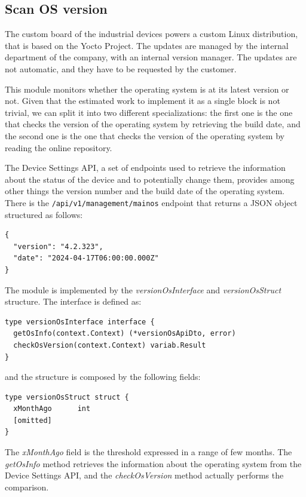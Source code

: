 \subsection{Scan OS version}

The custom board of the industrial devices powers a custom Linux distribution, that is based on the Yocto Project. The updates are managed by the internal department of the company, with an internal version manager. The updates are not automatic, and they have to be requested by the customer.

This module monitors whether the operating system is at its latest version or not. Given that the estimated work to implement it as a single block is not trivial, we can split it into two different specializations: the first one is the one that checks the version of the operating system by retrieving the build date, and the second one is the one that checks the version of the operating system by reading the online repository.

The Device Settings API, a set of endpoints used to retrieve the information about the status of the device and to potentially change them, provides among other things the version number and the build date of the operating system. There is the \texttt{/api/v1/management/mainos} endpoint that returns a JSON object structured as follows:

\begin{lstlisting}
{
  "version": "4.2.323",
  "date": "2024-04-17T06:00:00.000Z"
}
\end{lstlisting}

The module is implemented by the \textit{versionOsInterface} and \textit{versionOsStruct} structure. The interface is defined as:

\begin{lstlisting}[style=golang]
type versionOsInterface interface {
  getOsInfo(context.Context) (*versionOsApiDto, error)
  checkOsVersion(context.Context) variab.Result
}
\end{lstlisting}

and the structure is composed by the following fields:

\begin{lstlisting}[style=golang]
type versionOsStruct struct {
  xMonthAgo      int
  [omitted]
}
\end{lstlisting}

The \textit{xMonthAgo} field is the threshold expressed in a range of few months. The \textit{getOsInfo} method retrieves the information about the operating system from the Device Settings API, and the \textit{checkOsVersion} method actually performs the comparison.

